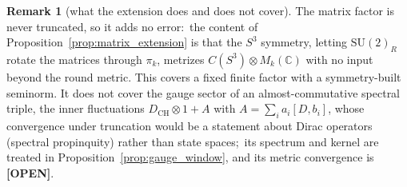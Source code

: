 \documentclass[11pt,a4paper]{article}
\theoremstyle{plain}
\theoremstyle{definition}
\newtheorem{remark}[theorem]{Remark}
\newcommand{\sthree}{S^{3}}
\newcommand{\C}{\mathbb{C}}
\newcommand{\SU}{\mathrm{SU}}
\newcommand{\DCH}{D_{\mathrm{CH}}}
\begin{document}
\begin{remark}[what the extension does and does not cover]
\label{rem:matrix_extension_scope}
The matrix factor is never truncated, so it adds no error:\ the content
of Proposition~\ref{prop:matrix_extension} is that the $\sthree$
symmetry, letting $\SU(2)_R$ rotate the matrices through $\pi_k$, metrizes
$C(\sthree) \otimes M_k(\C)$ with no input beyond the round metric.
This covers a fixed finite factor with a symmetry-built seminorm. It
does not cover the gauge sector of an almost-commutative spectral
triple, the inner fluctuations $\DCH \otimes 1 + A$ with $A = \sum_i
a_i [D, b_i]$, whose convergence under truncation would be a
statement about Dirac operators (spectral propinquity) rather than state
spaces;\ its spectrum and kernel are treated in
Proposition~\ref{prop:gauge_window}, and its metric convergence is
\textbf{[OPEN]}.
\end{remark}
\end{document}
